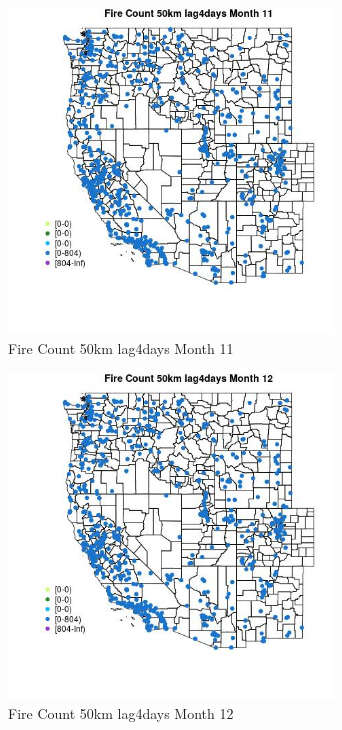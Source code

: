 \begin{figure} 
\centering  
\includegraphics[width=0.77\textwidth]{Code_Outputs/Report_ML_input_PM25_Step4_part_f_de_duplicated_aves_prioritize_24hr_obswNAs_MapObsMo11Fire_Count_50km_lag4days.jpg} 
\caption{\label{fig:Report_ML_input_PM25_Step4_part_f_de_duplicated_aves_prioritize_24hr_obswNAsMapObsMo11Fire_Count_50km_lag4days}Fire Count 50km lag4days Month 11} 
\end{figure} 
 

\begin{figure} 
\centering  
\includegraphics[width=0.77\textwidth]{Code_Outputs/Report_ML_input_PM25_Step4_part_f_de_duplicated_aves_prioritize_24hr_obswNAs_MapObsMo12Fire_Count_50km_lag4days.jpg} 
\caption{\label{fig:Report_ML_input_PM25_Step4_part_f_de_duplicated_aves_prioritize_24hr_obswNAsMapObsMo12Fire_Count_50km_lag4days}Fire Count 50km lag4days Month 12} 
\end{figure} 
 

